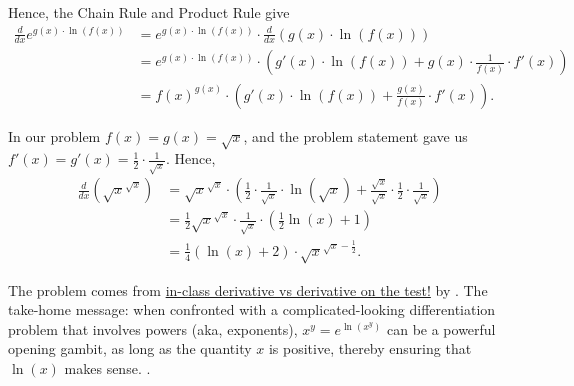 Hence, the Chain Rule and Product Rule give
\begin{align*}
    \frac{d}{dx} e^{g(x) \cdot \ln(f(x))} &= e^{g(x) \cdot \ln(f(x))} \cdot \frac{d}{dx}\left( g(x) \cdot \ln(f(x)) \right)  \\[1em]
    & = e^{g(x) \cdot \ln(f(x))} \cdot \left(g'(x) \cdot \ln(f(x)) + g(x) \cdot \frac{1}{f(x)} \cdot f'(x)\right)\\[1em]
    &= f(x)^{g(x)} \cdot \left(g'(x) \cdot \ln(f(x)) + \frac{g(x)}{f(x)} \cdot f'(x)\right).
\end{align*}

In our problem $f(x) = g(x) = \sqrt{x}$, and the problem statement gave us $f'(x) = g'(x) = \frac{1}{2} \cdot \frac{1}{\sqrt{x}}$. Hence,
\begin{align*}
    \frac{d}{dx}\left( \sqrt{x}^{\sqrt{x}} \right) &= \sqrt{x}^{\sqrt{x}} \cdot\left( \frac{1}{2} \cdot \frac{1}{\sqrt{x}} \cdot \ln\left( \sqrt{x}\right) + \frac{\sqrt{x}}{\sqrt{x}} \cdot  \frac{1}{2} \cdot \frac{1}{\sqrt{x}} \right) \\[1em]
    &= \frac{1}{2} \sqrt{x}^{\sqrt{x}} \cdot \frac{1}{\sqrt{x}} \cdot \left( \frac{1}{2} \ln(x) + 1 \right)\\[1em]
    & =  \frac{1}{4} \left( \ln(x) + 2 \right) \cdot \sqrt{x}^{\sqrt{x} - \frac{1}{2}}.
\end{align*} 

The problem comes from \href{https://youtu.be/zRvRq0DsMG0}{in-class derivative vs derivative on the test!} by \bprp. The take-home message: when confronted with a complicated-looking differentiation problem that involves powers (aka, exponents), $x^y = e^{\ln\left(x^y\right)}$ can be a powerful opening gambit, as long as the quantity $x$ is positive, thereby ensuring that $\ln(x)$ makes sense. 
\Qed. 

\bigskip


